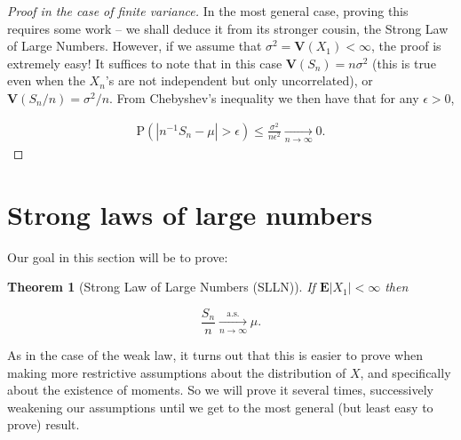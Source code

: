 \documentclass[11pt]{report}
\theoremstyle{plain}
\newtheorem{thm}{Theorem}[chapter]
\theoremstyle{definition}
\begin{document}
\begin{proof}[Proof in the case of finite variance]
In the most general case, proving this requires some
work -- we shall deduce it from its stronger cousin,
the Strong Law of Large Numbers. However, if we assume
that $\sigma^2 = \mathbf{V}(X_1)<\infty$, the proof
is extremely easy! It suffices to note that in this
case $\mathbf{V}(S_n) = n \sigma^2$ (this is true
even when the $X_n$'s are not independent but only
uncorrelated), or $\mathbf{V}(S_n/n) = \sigma^2/n$.
From Chebyshev's inequality we then have that for any
$\epsilon>0$,

\begin{align*}
\tag{17}\label{eq:variancebound}
\mathrm{P}(|n^{-1} S_n - \mu|>\epsilon) \le \frac{\sigma^2}{n \epsilon^2} \xrightarrow[n\to\infty]{} 0.
\end{align*}

\end{proof}

\section{Strong laws of large numbers}
Our goal in this section will be to prove:

\begin{thm}[Strong Law of Large Numbers (SLLN)]
\label{thm-slln}
If $\mathbf{E}|X_1|<\infty$ then

\[
\frac{S_n}{n} \xrightarrow[n\to\infty]{\textrm{a.s.}} \mu.
\]

\end{thm}

As in the case of the weak law, it turns out that
this is easier to prove when making more restrictive
assumptions about the distribution of $X$, and
specifically about the existence of moments. So we
will prove it several times, successively weakening
our assumptions until we get to the most general (but
least easy to prove) result.
\end{document}
